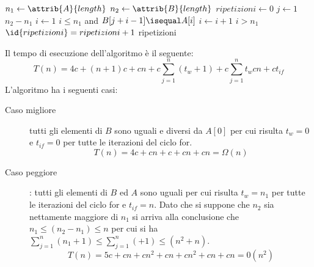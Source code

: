 \begin{codebox}
\li $n_1 \gets \attrib{A}{length}$
\li $n_2 \gets \attrib{B}{length}$
\li $ripetizioni \gets 0$
\li \For $j \gets 1$ \To $n_2 - n_1$
    \Do
\li                $i \gets 1$
\li                \While $i \leq n_1$ and $B[j+i-1] \isequal A[i]$
                   \Do
\li                               $i \gets i + 1$
                   \End
\li                \If $i > n_1$
                   \Then
\li                               $\id{ripetizioni} = ripetizioni + 1$
    \End
\li \Return ripetizioni
\end{codebox}
Il tempo di esecuzione dell'algoritmo è il seguente:
\begin{equation*}
  T(n) = 4c + (n+1)c + cn + c\sum _{j = 1} ^ n (t_{w} + 1) + c\sum _{j = 1} ^ n t_w
         cn + ct_{if}
\end{equation*}
L'algoritmo ha i seguenti casi:
\begin{description}
  \item[Caso migliore] tutti gli elementi di $B$ sono uguali e diversi da $A[0]$
        per cui risulta $t_w = 0$ e $t_{if} = 0$ per tutte le iterazioni del ciclo for.
        \begin{equation*}
          T(n) = 4c + cn + c + cn + cn = \Omega(n)
        \end{equation*}
  \item[Caso peggiore]: tutti gli elementi di $B$ ed $A$ sono uguali per cui risulta
         $t_w = n_1$ per tutte le iterazioni del ciclo for e $t_{if} = n$.
         Dato che si suppone che $n_2$ sia nettamente maggiore di $n_1$ si arriva
         alla conclusione che $n_1 \leq (n_2-n_1) \leq n$ per cui si ha $\sum _{j = 1} ^ n (n_1 + 1)
         \leq \sum _{j = 1} ^ n ( + 1) \leq (n^2 + n)$.
         \begin{equation*}
           T(n) = 5c + cn + cn^2 + cn + cn^2 + cn + cn = 0(n^2)
         \end{equation*}
\end{description}
